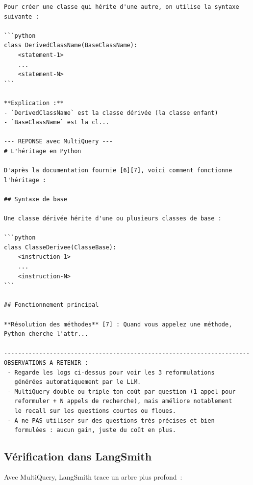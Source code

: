 \documentclass[11pt,a4paper]{article}
\begin{document}
\begin{tcolorbox}[
  colback=white,
  colframe=black!50,
  coltitle=black,
  fonttitle=\footnotesize\bfseries,
  fontupper=\footnotesize,
  title=Sortie de l'exécution,
  breakable,
]
\begin{verbatim}
Pour créer une classe qui hérite d'une autre, on utilise la syntaxe
suivante :

```python
class DerivedClassName(BaseClassName):
    <statement-1>
    ...
    <statement-N>
```

**Explication :**
- `DerivedClassName` est la classe dérivée (la classe enfant)
- `BaseClassName` est la cl...

--- REPONSE avec MultiQuery ---
# L'héritage en Python

D'après la documentation fournie [6][7], voici comment fonctionne
l'héritage :

## Syntaxe de base

Une classe dérivée hérite d'une ou plusieurs classes de base :

```python
class ClasseDerivee(ClasseBase):
    <instruction-1>
    ...
    <instruction-N>
```

## Fonctionnement principal

**Résolution des méthodes** [7] : Quand vous appelez une méthode,
Python cherche l'attr...

----------------------------------------------------------------------
OBSERVATIONS A RETENIR :
 - Regarde les logs ci-dessus pour voir les 3 reformulations
   générées automatiquement par le LLM.
 - MultiQuery double ou triple ton coût par question (1 appel pour
   reformuler + N appels de recherche), mais améliore notablement
   le recall sur les questions courtes ou floues.
 - A ne PAS utiliser sur des questions très précises et bien
   formulées : aucun gain, juste du coût en plus.
\end{verbatim}
\end{tcolorbox}

\subsection{Vérification dans LangSmith}

Avec MultiQuery, LangSmith trace un arbre plus profond~:

\begin{center}
\end{center}
\end{document}

